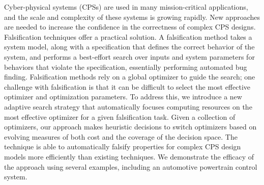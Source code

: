 Cyber-physical systems (CPSs) are used in many mission-critical applications, and the scale and complexity of these systems is growing rapidly.
New approaches are needed to increase the confidence in the correctness of complex CPS designs.
Falsification techniques offer a practical solution. 
A falsification method takes a system model, along with a specification that defines the correct behavior of the system, and performs a best-effort search over inputs and system parameters for behaviors that violate the specification, essentially performing automated bug finding.
Falsification methods rely on a global optimizer to guide the search; one challenge with falsification is that it can be difficult to select the most effective optimizer and optimization parameters.
To address this, we introduce a new adaptive search strategy that automatically focuses computing resources on the most effective optimizer for a given falsification task.
Given a collection of optimizers, our approach makes heuristic decisions to switch optimizers based on
evolving measures of both cost and the coverage of the decision space.
The technique is able to automatically falsify properties for complex CPS design models more efficiently than existing techniques.
We demonstrate the efficacy of the approach using several examples, including an automotive powertrain control system.